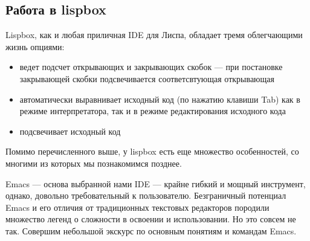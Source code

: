 \documentclass[a4paper, 12pt, titlepage, twoside]{article}
\begin{document}
\subsection{Работа в lispbox}
Lispbox, как и любая приличная IDE для Лиспа, обладает тремя облегчающими жизнь опциями:
\begin{itemize}
\item ведет подсчет открывающих и закрывающих скобок --- при постановке закрывающей скобки подсвечивается соответсвтующая открывающая
\item автоматически выравнивает исходный код (по нажатию клавиши Tab) как в режиме интерпретатора, так и в режиме редактирования исходного кода
\item подсвечивает исходный код
\end{itemize}
Помимо перечисленного выше, у lispbox есть еще множество особенностей, со многими из которых мы познакомимся позднее.

Emacs --- основа выбранной нами IDE --- крайне гибкий и мощный инструмент, однако, довольно требовательный к пользователю. Безграничный потенциал Emacs и его отличия от традиционных текстовых редакторов породили множество легенд о сложности в освоении и использовании. Но это совсем не так. Совершим небольшой экскурс по основным понятиям и командам Emacs.
\end{document}
